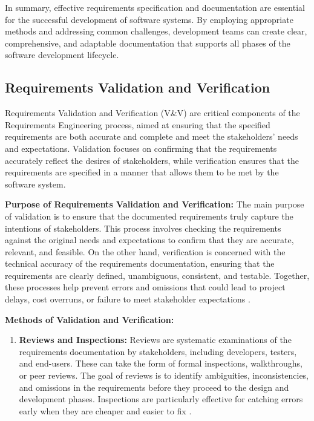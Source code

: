 \begin{refsection}
In summary, effective requirements specification and documentation are essential for the successful development of software systems. By employing appropriate methods and addressing common challenges, development teams can create clear, comprehensive, and adaptable documentation that supports all phases of the software development lifecycle.

\subsection{Requirements Validation and Verification}

Requirements Validation and Verification (V\&V) are critical components of the Requirements Engineering process, aimed at ensuring that the specified requirements are both accurate and complete and meet the stakeholders' needs and expectations. Validation focuses on confirming that the requirements accurately reflect the desires of stakeholders, while verification ensures that the requirements are specified in a manner that allows them to be met by the software system.

\textbf{Purpose of Requirements Validation and Verification:} The main purpose of validation is to ensure that the documented requirements truly capture the intentions of stakeholders. This process involves checking the requirements against the original needs and expectations to confirm that they are accurate, relevant, and feasible. On the other hand, verification is concerned with the technical accuracy of the requirements documentation, ensuring that the requirements are clearly defined, unambiguous, consistent, and testable. Together, these processes help prevent errors and omissions that could lead to project delays, cost overruns, or failure to meet stakeholder expectations \cite[pp.~101-120]{pohl2010requirements}.

\textbf{Methods of Validation and Verification:}

\begin{enumerate}
    \item \textbf{Reviews and Inspections:} Reviews are systematic examinations of the requirements documentation by stakeholders, including developers, testers, and end-users. These can take the form of formal inspections, walkthroughs, or peer reviews. The goal of reviews is to identify ambiguities, inconsistencies, and omissions in the requirements before they proceed to the design and development phases. Inspections are particularly effective for catching errors early when they are cheaper and easier to fix \cite[pp.~70-85]{wiegers2013software}.
    

\end{enumerate}
\end{refsection}
